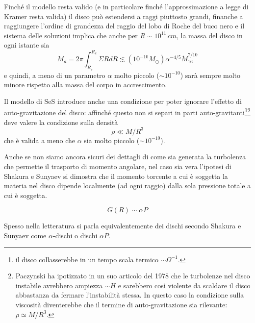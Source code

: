 \documentclass[a4paperbi]{article}
\begin{document}
	Finché il modello resta valido (e in particolare finché l'approssimazione a legge di Kramer resta valida) il disco può estendersi a raggi piuttosto grandi, finanche a raggiungere l'ordine di grandezza del raggio del lobo di Roche del buco nero e il sistema delle soluzioni implica che anche per $R\sim10^{11}\,cm$, la massa del disco in ogni istante sia
	\begin{equation}
		M_d=2\pi\int^{R_{e}}_{R_\star}\Sigma RdR\lesssim (10^{-10}M_\odot)\alpha^{-4/5}\dot{M}^{7/10}_{16}
	\end{equation}
	e quindi, a meno di un parametro $\alpha$ molto piccolo ($\sim10^{-10}$) sarà sempre molto minore rispetto alla massa del corpo in accrescimento.
	
	Il modello di SeS introduce anche una condizione per poter ignorare l'effetto di auto-gravitazione del disco: affinché questo non si separi in parti auto-gravitanti\footnote{il disco collasserebbe in un tempo scala termico $\sim\Omega^{-1}$.}\footnote{Paczynski ha ipotizzato in un suo articolo del 1978 che le turbolenze nel disco instabile avrebbero ampiezza $\sim H$ e sarebbero così violente da scaldare il disco abbastanza da fermare l'instabilità stessa. In questo caso la condizione sulla viscosità diventerebbe che il termine di auto-gravitazione sia rilevante: $\rho\simeq M/R^3$.} deve valere la condizione sulla densità
		\begin{equation}
			\rho\ll M/R^3
		\end{equation}
	che è valida a meno che $\alpha$ sia molto piccolo ($\sim10^{-10}$).
	
	Anche se non siamo ancora sicuri dei dettagli di come sia generata la turbolenza che permette il trasporto di momento angolare, nel caso sia vera l'ipotesi di Shakura e Sunyaev si dimostra che il momento torcente a cui è soggetta la materia nel disco dipende localmente (ad ogni raggio) dalla sola pressione totale a cui è soggetta.

	\begin{equation}
		G(R)\sim\alpha P
	\end{equation}
	
	Spesso nella letteratura si parla equivalentemente dei dischi secondo Shakura e Sunyaev come $\alpha$-dischi o dischi $\alpha P$.
	
\end{document}
